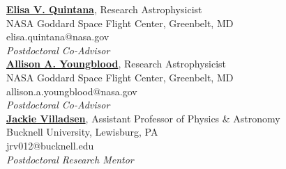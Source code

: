 \documentclass[12pt]{article}
\begin{document}
\noindent
\href{https://science.gsfc.nasa.gov/sci/bio/elisa.quintana}{\textbf{Elisa V. Quintana}}, Research Astrophysicist \\ NASA Goddard Space Flight Center, Greenbelt, MD \\
elisa.quintana@nasa.gov \\
\textit{Postdoctoral Co-Advisor} \\

\noindent
\href{https://science.gsfc.nasa.gov/sed/bio/allison.a.youngblood}{\textbf{Allison A. Youngblood}}, Research Astrophysicist \\ NASA Goddard Space Flight Center, Greenbelt, MD \\
allison.a.youngblood@nasa.gov \\
\textit{Postdoctoral Co-Advisor} \\

\noindent
\href{https://www.bucknell.edu/fac-staff/jackie-villadsen}{\textbf{Jackie Villadsen}}, Assistant Professor of Physics \& Astronomy \\ Bucknell University, Lewisburg, PA \\
jrv012@bucknell.edu \\
\textit{Postdoctoral Research Mentor} \\
\end{document}
